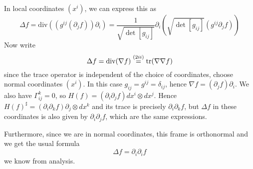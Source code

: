 \documentclass[a4paper, 12pt]{article}
\begin{document}
\begin{Exercise}
\begin{enumerate}[label=(\roman*)]
            In local coordinates $(x^i)$, we can express this as
            \[
                \Delta f
                = \text{div}((g^{ij}(\partial_j f))\partial_i)
                = \frac{1}{\sqrt{\det[g_{ij}]}} \partial_i \left( \sqrt{\det[g_{ij}]} (g^{ij}\partial_j f) \right)
            \]
            Now write
            \[
                \Delta f = \text{div}(\nabla f)
                \overset{(2ii)}{=} \operatorname{tr}(\nabla\nabla f)
            \]
            since the trace operator is independent of the choice of coordinates,
            choose normal coordinates $(x^i)$.
            In this case $g_{ij} = g^{ij} = \delta_{ij}$,
            hence $\nabla f = (\partial_j f) \partial_i$.
            We also have $\Gamma_{ij}^k = 0$, so $H(f) = (\partial_i\partial_j f)dx^i\otimes dx^j$.
            Hence $H(f)^\sharp = (\partial_i\partial_k f) \partial_j \otimes dx^k$
            and its trace is precisely $\partial_i \partial_k f$,
            but $\Delta f$ in these coordinates is also given by $\partial_i\partial_j f$,
            which are the same expressions.

            Furthermore, since we are in normal coordinates, this frame is orthonormal and we get the usual formula
            \[
                \Delta f = \partial_i \partial_i f
            \]
            we know from analysis.
    \end{enumerate}
\end{Exercise}
\end{document}
